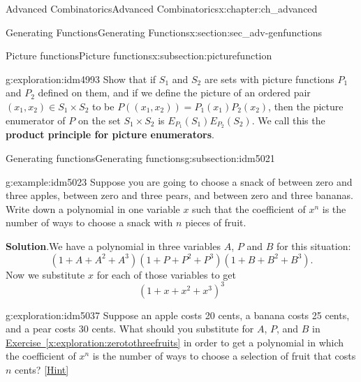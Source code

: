 \documentclass[oneside,10pt,]{book}
\newcommand{\terminology}[1]{\textbf{#1}}
\numberwithin{equation}{chapter}
\begin{document}
\begin{chapterptx}{Advanced Combinatorics}{}{Advanced Combinatorics}{}{}{x:chapter:ch_advanced}
\begin{sectionptx}{Generating Functions}{}{Generating Functions}{}{}{x:section:sec_adv-genfunctions}
\begin{subsectionptx}{Picture functions}{}{Picture functions}{}{}{x:subsection:picturefunction}
\begin{exploration}{}{g:exploration:idm4993}%
Show that if \(S_1\) and \(S_2\) are sets with picture functions \(P_1\) and \(P_2\) defined on them, and if we define the picture of an ordered pair \((x_1,x_2)\in S_1\times S_2\) to be \(P((x_1,x_2))= P_1(x_1)P_2(x_2)\), then the picture enumerator of \(P\) on the set \(S_1\times S_2\) is \(E_{P_1}(S_1)E_{P_2}(S_2)\). We call this the \terminology{product principle for picture enumerators}.%
\end{exploration}
\end{subsectionptx}
%
%
\typeout{************************************************}
\typeout{************************************************}
%
\begin{subsectionptx}{Generating functions}{}{Generating functions}{}{}{g:subsection:idm5021}
\begin{example}{}{g:example:idm5023}%
Suppose you are going to choose a snack of between zero and three apples, between zero and three pears, and between zero and three bananas. Write down a polynomial in one variable \(x\) such that the coefficient of \(x^n\) is the number of ways to choose a snack with \(n\) pieces of fruit.%
\par\smallskip%
\noindent\textbf{Solution}.\hypertarget{g:solution:idm5029}{}\quad{}We have a polynomial in three variables \(A\), \(P\) and \(B\) for this situation:%
\begin{equation*}
(1+A +A^2 +A^3)(1+P+P^2+P^3)(1+B+B^2+B^3)\text{.}
\end{equation*}
Now we substitute \(x\) for each of those variables to get%
\begin{equation*}
(1+x+x^2+x^3)^3
\end{equation*}
%
\end{example}
\begin{exploration}{}{g:exploration:idm5037}%
Suppose an apple costs 20 cents, a banana costs 25 cents, and a pear costs 30 cents. What should you substitute for \(A\), \(P\), and \(B\) in \hyperref[x:exploration:zerotothreefruits]{Exercise~\ref{x:exploration:zerotothreefruits}} in order to get a polynomial in which the coefficient of \(x^n\) is the number of ways to choose a selection of fruit that costs \(n\) cents?%
\space\hspace*{0pt}\hfill{\tiny\hyperlink{g:hint:idm5046-back}{[Hint]}}\end{exploration}

\end{subsectionptx}
\end{sectionptx}
\end{chapterptx}
\end{document}
